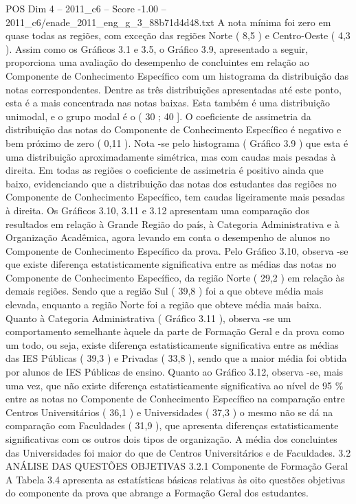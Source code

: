 \begin{textsample}{POS Dim 4 – 2011\_c6 – Score -1.00 – 2011\_c6/enade\_2011\_eng\_g\_3\_88b71d4d48.txt}
A nota mínima foi zero em quase todas as regiões, com exceção das regiões Norte ( 8,5 ) e Centro-Oeste ( 4,3 ).
Assim como os Gráficos 3.1 e 3.5, o Gráfico 3.9, apresentado a seguir, proporciona uma avaliação do desempenho de concluintes em relação ao Componente de Conhecimento Específico com um histograma da distribuição das notas correspondentes.
Dentre as três distribuições apresentadas até este ponto, esta é a mais concentrada nas notas baixas.
Esta também é uma distribuição unimodal, e o grupo modal é o ( 30 ; 40 ].
O coeficiente de assimetria da distribuição das notas do Componente de Conhecimento Específico é negativo e bem próximo de zero ( 0,11 ).
Nota -se pelo histograma ( Gráfico 3.9 ) que esta é uma distribuição aproximadamente simétrica, mas com caudas mais pesadas à direita.
Em todas as regiões o coeficiente de assimetria é positivo ainda que baixo, evidenciando que a distribuição das notas dos estudantes das regiões no Componente de Conhecimento Específico, tem caudas ligeiramente mais pesadas à direita.
Os Gráficos 3.10, 3.11 e 3.12 apresentam uma comparação dos resultados em relação à Grande Região do país, à Categoria Administrativa e à Organização Acadêmica, agora levando em conta o desempenho de alunos no Componente de Conhecimento Específico da prova.
Pelo Gráfico 3.10, observa -se que existe diferença estatisticamente significativa entre as médias das notas no Componente de Conhecimento Específico, da região Norte ( 29,2 ) em relação às demais regiões.
Sendo que a região Sul ( 39,8 ) foi a que obteve média mais elevada, enquanto a região Norte foi a região que obteve média mais baixa.
Quanto à Categoria Administrativa ( Gráfico 3.11 ), observa -se um comportamento semelhante àquele da parte de Formação Geral e da prova como um todo, ou seja, existe diferença estatisticamente significativa entre as médias das IES Públicas ( 39,3 ) e Privadas ( 33,8 ), sendo que a maior média foi obtida por alunos de IES Públicas de ensino.
Quanto ao Gráfico 3.12, observa -se, mais uma vez, que não existe diferença estatisticamente significativa ao nível de 95 \% entre as notas no Componente de Conhecimento Específico na comparação entre Centros Universitários ( 36,1 ) e Universidades ( 37,3 ) o mesmo não se dá na comparação com Faculdades ( 31,9 ), que apresenta diferenças estatisticamente significativas com os outros dois tipos de organização.
A média dos concluintes das Universidades foi maior do que de Centros Universitários e de Faculdades. 3.2 ANÁLISE DAS QUESTÕES OBJETIVAS 3.2.1 Componente de Formação Geral A Tabela 3.4 apresenta as estatísticas básicas relativas às oito questões objetivas do componente da prova que abrange a Formação Geral dos estudantes.

\end{textsample}
